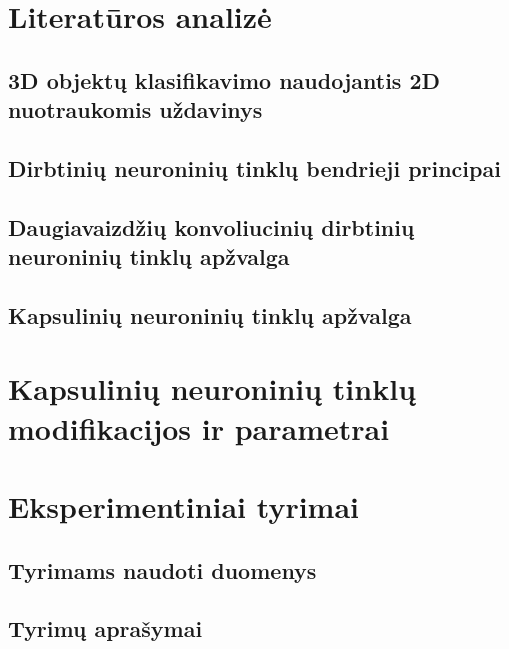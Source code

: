 \documentclass{VUMIFInfMagistrinis}
\begin{document}
\section{Literatūros analizė}

\subsection{3D objektų klasifikavimo naudojantis 2D nuotraukomis uždavinys}


\subsection{Dirbtinių neuroninių tinklų bendrieji principai}




\subsection{Daugiavaizdžių konvoliucinių dirbtinių neuroninių tinklų apžvalga}




\subsection{Kapsulinių neuroninių tinklų apžvalga}


\section{Kapsulinių neuroninių tinklų modifikacijos ir parametrai}


\section{Eksperimentiniai tyrimai}

\subsection{Tyrimams naudoti duomenys}


\subsection{Tyrimų aprašymai}





\printbibliography[heading=bibintoc]  %

\appendix  %
\end{document}
